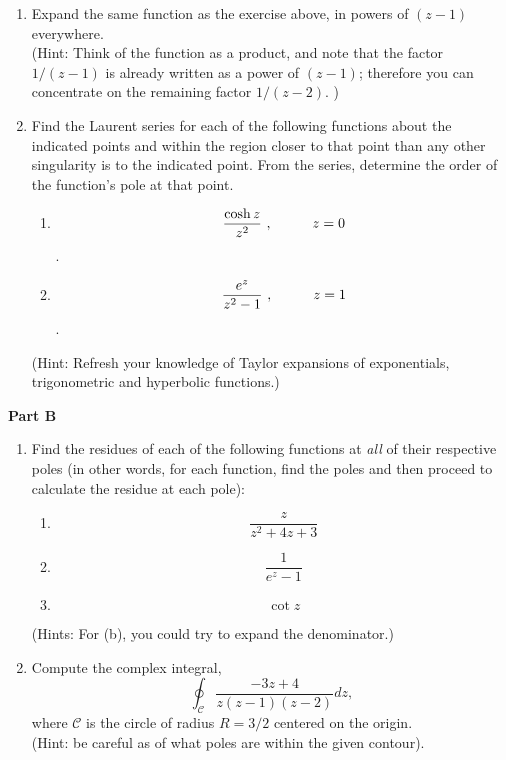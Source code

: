 \documentclass[fleqn]{article}
\begin{document}
\begin{enumerate}
    \item Expand the same function as the exercise above, in powers of $(z - 1)$ everywhere.\\
     (Hint: Think of the function as a product, and note that the factor $1/(z-1)$ is already written as a power of $(z-1)$; therefore you can concentrate on the remaining factor $1/(z-2)$. )
    
    \item Find the Laurent series for each of the following functions about the indicated points and within the region closer to that point than any other singularity is to the indicated point. From the series, determine the order of the function's pole at that point.
    \begin{enumerate}
      \item $$\frac{\cosh z}{z^2}~, \hskip 1truecm z=0$$ . 
      \item $$\frac{e^z}{z^2-1}~, \hskip 1truecm z=1$$.    
    \end{enumerate}
    (Hint: Refresh your knowledge of Taylor expansions of exponentials, trigonometric and hyperbolic functions.)
    
  \end{enumerate}

  \pagebreak

  \textbf{Part B}
  \begin{enumerate}

    \item Find the residues of each of the following functions at \emph{all} of their respective poles (in other words, for each function, find the poles and then proceed to calculate the residue at each pole):
    \begin{enumerate}
      \item $$\frac{z}{z^2 + 4z + 3}$$
      
      \item $$\frac{1}{e^z - 1}$$
      
      \item $$\cot z$$
    \end{enumerate}
    (Hints:  For (b), you could try to expand the denominator.) 
    
    
    \item Compute the complex integral,
    $$ \oint_{\mathcal C} \frac{-3z + 4}{z(z-1)(z-2)} dz ,$$
    where ${\mathcal C}$ is the circle of radius $R=3/2$ centered on the origin. \\
    (Hint:  be careful as of what poles are within the given contour). 
    
  \end{enumerate}
\end{document}
